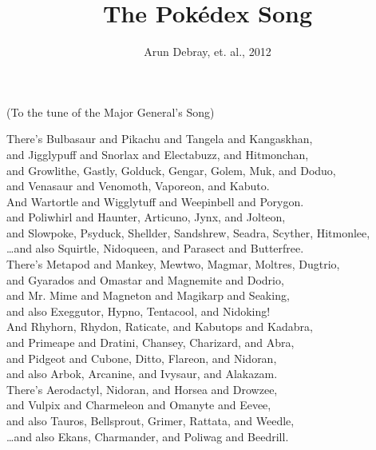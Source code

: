 \documentclass{amsart}
\begin{document}
\title{The Pok\'{e}dex Song}
\author{Arun Debray, et. al., 2012}
\maketitle
\begin{center}
(To the tune of the Major General's Song)\\
\end{center}
\vspace{0.1in}
There's Bulbasaur and Pikachu and Tangela and Kangaskhan,\\
and Jigglypuff and Snorlax and Electabuzz, and Hitmonchan,\\
and Growlithe, Gastly, Golduck, Gengar, Golem, Muk, and Doduo,\\
and Venasaur and Venomoth, Vaporeon, and Kabuto.\\

And Wartortle and Wigglytuff and Weepinbell and Porygon.\\
and Poliwhirl and Haunter, Articuno, Jynx, and Jolteon,\\
and Slowpoke, Psyduck, Shellder, Sandshrew, Seadra, Scyther, Hitmonlee,\\
\dots and also Squirtle, Nidoqueen, and Parasect and Butterfree.\\

There's Metapod and Mankey, Mewtwo, Magmar, Moltres, Dugtrio,\\
and Gyarados and Omastar and Magnemite and Dodrio,\\
and Mr. Mime and Magneton and Magikarp and Seaking,\\
and also Exeggutor, Hypno, Tentacool, and Nidoking!\\

And Rhyhorn, Rhydon, Raticate, and Kabutops and Kadabra,\\
and Primeape and Dratini, Chansey, Charizard, and Abra,\\
and Pidgeot and Cubone, Ditto, Flareon, and Nidoran\male,\\
and also Arbok, Arcanine, and Ivysaur, and Alakazam.\\

There's Aerodactyl, Nidoran\female, and Horsea and Drowzee,\\
and Vulpix and Charmeleon and Omanyte and Eevee,\\
and also Tauros, Bellsprout, Grimer, Rattata, and Weedle,\\
\dots and also Ekans, Charmander, and Poliwag and Beedrill.\\
\end{document}
